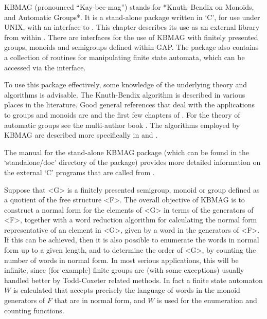 \def\KBMAG{\sf KBMAG}
\def\rkbp{\sf rkbp}
\def\Automata{\sf Automata}
\def\fsa{\sf fsa}


{\KBMAG}  (pronounced ``Kay-bee-mag'') stands  for *Knuth--Bendix on
Monoids, and Automatic Groups*.  It  is a stand-alone package  written
in `C', for use under UNIX, with an interface to {\GAP}.  This chapter
describes  its use as  an external  library from within {\GAP}.
There are interfaces for the use of {\KBMAG} with finitely
presented groups, monoids and semigroups defined within {\sf GAP}.
The package also contains a collection of routines for manipulating
finite state automata, which can be accessed via the {\GAP}
interface.

To use  this  package effectively,  some  knowledge  of the underlying
theory  and algorithms  is  advisable.  The  Knuth-Bendix algorithm is
described in various places in the literature. Good general references
that deal with the applications to groups and monoids are \cite{LeC86}
and  the  first few  chapters of   \cite{Sims94}.   For the  theory of
automatic   groups  see  the   multi-author book  \cite{ECHLPT92}. The
algorithms employed by {\KBMAG}   are described more  specifically  in
\cite{EHR91} and \cite{Holt94}.

The manual for the stand-alone {\KBMAG} package (which can be found in
the `standalone/doc' directory of the package) provides more detailed
information on    the external `C'   programs that  are called   from {\GAP}.

Suppose that <G> is a finitely presented semigroup, monoid or group
defined as a quotient of the free structure <F>.
The overall  objective of {\KBMAG} is  to construct a  normal form for
the elements of  <G> in terms of the generators of <F>,
together with  a word reduction algorithm for  calculating
the normal form representative  of an element in  <G>, given by a word
in the generators of <F>.
If this can be achieved,  then it is also possible
to enumerate the words  in normal form up to   a given length,  and to
determine the order  of <G>, by counting  the number of words in
normal  form. In most  serious  applications,  this will be  infinite,
since (for example) finite groups are (with some  exceptions) usually
handled better by Todd-Coxeter related methods.
In fact a  finite state automaton $W$
is  calculated  that accepts precisely the   language of words  in the
monoid  generators of $F$ that are   in normal form,  and $W$  is used for the
enumeration  and counting  functions.

